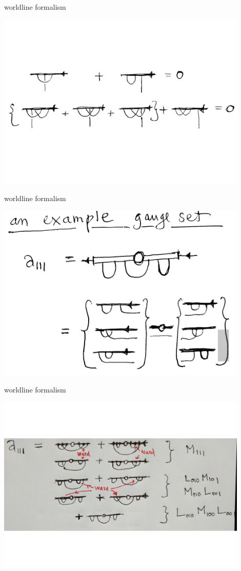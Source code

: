 \begin{frame}{worldline formalism}
\begin{center}
\includegraphics[width=0.90\textwidth]{WardIds}
\end{center}
\end{frame}
\begin{frame}{worldline formalism}
\begin{center}
\includegraphics[width=0.90\textwidth]{a111a}
\end{center}
\end{frame}
\begin{frame}{worldline formalism}
\begin{center}
\includegraphics[width=0.90\textwidth]{a111b}
\end{center}
\end{frame}

